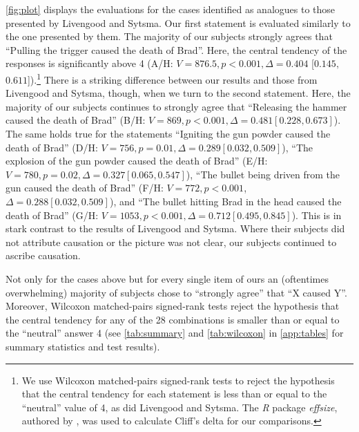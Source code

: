 \documentclass[12pt]{scrartcl}
\begin{document}
\noindent\autoref{fig:plot} displays the evaluations for the cases identified as analogues to those presented by Livengood and Sytsma. Our first statement is evaluated similarly to the one presented by them. The majority of our subjects strongly agrees that \enquote{Pulling the trigger caused the death of Brad}. Here, the central tendency of the responses is significantly above 4 (A/H: $V = 876.5, p < 0.001, \Delta = 0.404$ [$0.145,$ $0.611$]).\footnote{We use Wilcoxon matched-pairs signed-rank tests to reject the hypothesis that the central tendency for each statement is less than or equal to the \enquote{neutral} value of 4, as did Livengood and Sytsma. The \emph{R} package \emph{effsize}, authored by \cite{torchiano_effsize_2020}, was used to calculate Cliff's delta for our comparisons.} There is a striking difference between our results and those from Livengood and Sytsma, though, when we turn to the second statement. Here, the majority of our subjects continues to strongly agree that \enquote{Releasing the hammer caused the death of Brad} (B/H: $V = 869, p < 0.001, \Delta= 0.481 \left[0.228, 0.673\right]$). The same holds true for the statements \enquote{Igniting the gun powder caused the death of Brad} (D/H: $V = 756, p = 0.01, \Delta = 0.289 \left[0.032, 0.509\right]$), \enquote{The explosion of the gun powder caused the death of Brad} (E/H: $V = 780, p = 0.02, \Delta = 0.327 \left[0.065, 0.547\right]$), \enquote{The bullet being driven from the gun caused the death of Brad} (F/H: $V = 772, p < 0.001$, $\Delta = 0.288 \left[0.032, 0.509\right]$), and \enquote{The bullet hitting Brad in the head caused the death of Brad} (G/H: $V = 1053, p < 0.001, \Delta = 0.712 [0.495, 0.845]$). This is in stark contrast to the results of Livengood and Sytsma. Where their subjects did not attribute causation or the picture was not clear, our subjects continued to ascribe causation.

Not only for the cases above but for every single item of ours an (oftentimes overwhelming) majority of subjects chose to \enquote{strongly agree} that \enquote{X caused Y}. Moreover, Wilcoxon matched-pairs signed-rank tests reject the hypothesis that the central tendency for any of the 28 combinations is smaller than or equal to the \enquote{neutral} answer 4 (see \autoref{tab:summary} and \autoref{tab:wilcoxon} in \autoref{app:tables} for summary statistics and test results).
\end{document}
